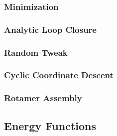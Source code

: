 \subsubsection{Minimization}
\label{subsubsection:minimization}


\subsubsection{Analytic Loop Closure}
\label{subsubsection:analytic_loop_closure}


\subsubsection{Random Tweak}
\label{subsubsection:tweak}


\subsubsection{Cyclic Coordinate Descent}
\label{subsubsection:cyclic_coordinate_descent}


\subsubsection{Rotamer Assembly}
\label{subsubsection:rotamer_assembly}


\subsection{Energy Functions}
\label{subsection:energy_functions}


